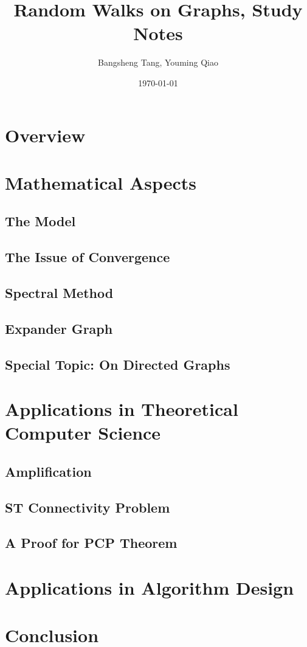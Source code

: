 \documentclass[11pt]{article}
\begin{document}
\title{Random Walks on Graphs, Study Notes}
\author{Bangsheng Tang, Youming Qiao}
\date{\today}
\maketitle

\section{Overview}


\section{Mathematical Aspects}

\subsection{The Model}


\subsection{The Issue of Convergence}


\subsection{Spectral Method}


\subsection{Expander Graph}


\subsection{Special Topic: On Directed Graphs}


\section{Applications in Theoretical Computer Science}

\subsection{Amplification}


\subsection{ST Connectivity Problem}


\subsection{A Proof for PCP Theorem}


\section{Applications in Algorithm Design}


\section{Conclusion}



\end{document}
